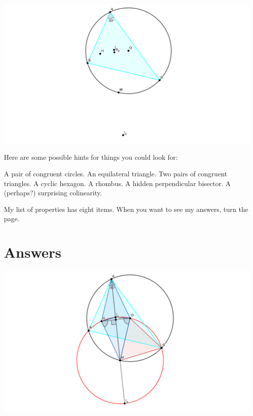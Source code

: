 \documentclass[11pt]{scrartcl}
\begin{document}
\begin{center}
	\includegraphics{A60Blank.png}
\end{center}

Here are some possible hints for things you could look for:
\begin{itemize}
	\ii A pair of congruent circles.
	\ii An equilateral triangle.
	\ii Two pairs of congruent triangles.
	\ii A cyclic hexagon.
	\ii A rhombus.
	\ii A hidden perpendicular bisector.
    \ii A (perhaps?) surprising colinearity.
\end{itemize}

My list of properties has eight items.
When you want to see my answers, turn the page.

\eject

\section{Answers}
\begin{center}
	\includegraphics{A60Full.png}
\end{center}
\end{document}
